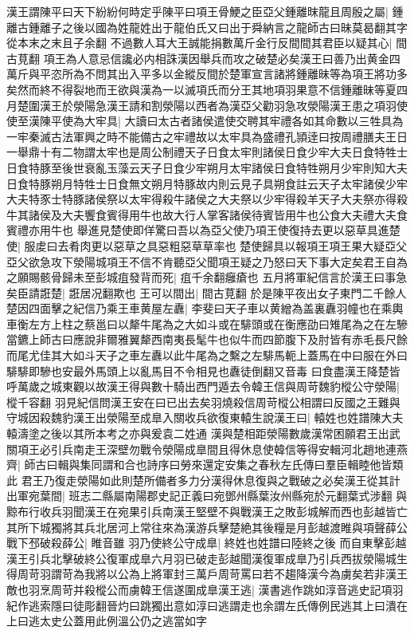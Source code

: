 漢王謂陳平曰天下紛紛何時定乎陳平曰項王骨鯁之臣亞父鍾離昩龍且周殷之屬|{
	鍾離古鍾離子之後以國為姓龍姓出于龍伯氏又曰出于舜納言之龍師古曰昧莫曷翻其字從本末之末且子余翻}
不過數人耳大王誠能捐數萬斤金行反間間其君臣以疑其心|{
	間古莧翻}
項王為人意忌信讒必内相誅漢因舉兵而攻之破楚必矣漢王曰善乃出黄金四萬斤與平恣所為不問其出入平多以金縱反間於楚軍宣言諸將鍾離昧等為項王將功多矣然而終不得裂地而王欲與漢為一以滅項氏而分王其地項羽果意不信鍾離昧等夏四月楚圍漢王於滎陽急漢王請和割滎陽以西者為漢亞父勸羽急攻滎陽漢王患之項羽使使至漢陳平使為大牢具|{
	大讀曰太古者諸侯遣使交聘其牢禮各如其命數以三牲具為一牢秦滅古法軍興之時不能備古之牢禮故以太牢具為盛禮孔頴逹曰按周禮膳夫王日一舉鼎十有二物謂太牢也是周公制禮天子日食太牢則諸侯日食少牢大夫日食特牲士日食特豚至後世衰亂玉藻云天子日食少牢朔月太牢諸侯日食特牲朔月少牢則知大夫日食特豚朔月特牲士日食無文朔月特豚故内則云見子具朔食註云天子太牢諸侯少牢大夫特豕士特豚諸侯祭以太牢得殺牛諸侯之大夫祭以少牢得殺羊天子大夫祭亦得殺牛其諸侯及大夫饗食賓得用牛也故大行人掌客諸侯待賓皆用牛也公食大夫禮大夫食賓禮亦用牛也}
舉進見楚使即佯驚曰吾以為亞父使乃項王使復持去更以惡草具進楚使|{
	服䖍曰去肴肉更以惡草之具惡粗惡草草率也}
楚使歸具以報項王項王果大疑亞父亞父欲急攻下滎陽城項王不信不肯聽亞父聞項王疑之乃怒曰天下事大定矣君王自為之願賜骸骨歸未至彭城疽發背而死|{
	疽千余翻癰瘡也}
五月將軍紀信言於漢王曰事急矣臣請誑楚|{
	誑居况翻欺也}
王可以間出|{
	間古莧翻}
於是陳平夜出女子東門二千餘人楚因四面擊之紀信乃乘王車黄屋左纛|{
	李斐曰天子車以黄繒為盖裏纛羽幢也在乘輿車衡左方上柱之蔡邕曰以犛牛尾為之大如斗或在騑頭或在衡應劭曰雉尾為之在左驂當鑣上師古曰應說非爾雅翼犛西南夷長髦牛也似牛而四節腹下及肘皆有赤毛長尺餘而尾尤佳其大如斗天子之車左纛以此牛尾為之繫之左騑馬軛上蓋馬在中曰服在外曰騑騑即驂也安最外馬頭上以亂馬目不令相見也纛徒倒翻又音毒}
曰食盡漢王降楚皆呼萬歲之城東觀以故漢王得與數十騎出西門遁去令韓王信與周苛魏豹樅公守滎陽|{
	樅千容翻}
羽見紀信問漢王安在曰已出去矣羽燒殺信周苛樅公相謂曰反國之王難與守城因殺魏豹漢王出滎陽至成臯入關收兵欲復東轅生說漢王曰|{
	轅姓也姓譜陳大夫轅濤塗之後以其所本考之亦與爰袁二姓通}
漢與楚相距滎陽數歲漢常困願君王出武關項王必引兵南走王深壁勿戰令滎陽成臯間且得休息使韓信等得安輯河北趙地連燕齊|{
	師古曰輯與集同謂和合也詩序曰勞來還定安集之春秋左氏傳曰羣臣輯睦他皆類此}
君王乃復走滎陽如此則楚所備者多力分漢得休息復與之戰破之必矣漢王從其計出軍宛葉間|{
	班志二縣屬南陽郡史記正義曰宛鄧州縣葉汝州縣宛於元翻葉式涉翻}
與黥布行收兵羽聞漢王在宛果引兵南漢王堅壁不與戰漢王之敗彭城解而西也彭越皆亡其所下城獨將其兵北居河上常往來為漢游兵擊楚絶其後糧是月彭越渡睢與項聲薛公戰下邳破殺薛公|{
	睢音雖}
羽乃使終公守成臯|{
	終姓也姓譜曰陸終之後}
而自東擊彭越漢王引兵北擊破終公復軍成臯六月羽已破走彭越聞漢復軍成臯乃引兵西拔滎陽城生得周苛羽謂苛為我將以公為上將軍封三萬戶周苛罵曰若不趨降漢今為虜矣若非漢王敵也羽烹周苛并殺樅公而虜韓王信遂圍成臯漢王逃|{
	漢書逃作跳如淳音逃史記項羽紀作逃索隱曰徒彫翻晉灼曰跳獨出意如淳曰逃謂走也余謂左氏傳例民逃其上曰潰在上曰逃太史公蓋用此例溫公仍之逃當如字}
